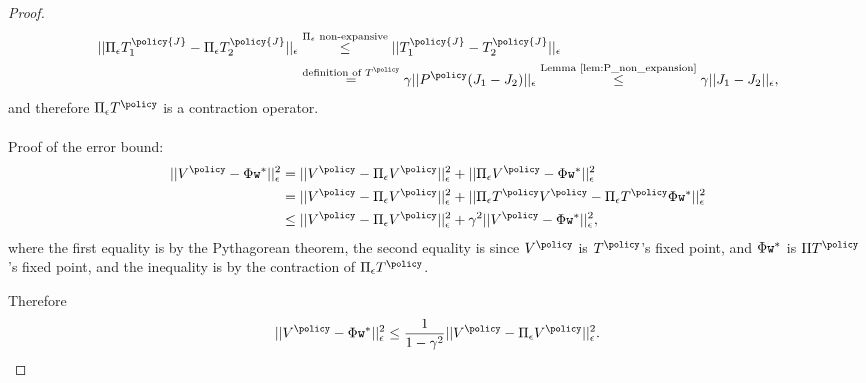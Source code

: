 \begin{proof}
\begin{equation*}
\begin{split}
||\Pi_\epsilon T^\policy {J}_1 - \Pi_\epsilon T^\policy {J}_2||_\epsilon &\overset{\Pi_\epsilon \textrm{ non-expansive}}{\le} ||T^\policy {J}_1 - T^\policy {J}_2||_\epsilon\\
&\overset{\textrm{definition of } T^\policy}{=} \gamma||P^\policy({J}_1-{J}_2)||_\epsilon \overset{\textrm{Lemma \ref{lem:P_non_expansion}}}{\le} \gamma||{J}_1-{J}_2||_\epsilon ,
\end{split}
\end{equation*}
and therefore $\Pi_\epsilon T^\policy$ is a contraction operator.
\\
\\
Proof of the error bound:
\begin{equation}
\begin{split}
  ||V^\policy - \FtrMtx \weights^*||_\epsilon^2  &= ||V^\policy
-\Pi_\epsilon V^\policy||_\epsilon^2 + ||\Pi_\epsilon V^\policy -\FtrMtx \weights^*||_\epsilon^2  \\
    &= ||V^\policy -\Pi_\epsilon V^\policy||_\epsilon^2 + ||\Pi_\epsilon T^\policy V^\policy -\Pi_\epsilon T^\policy\FtrMtx \weights^*||_\epsilon^2 \\
&\leq ||V^\policy -\Pi_\epsilon V^\policy||_\epsilon^2 + \gamma^2||V^\policy-\FtrMtx \weights^*||_\epsilon^2,
\end{split}
\end{equation}
where the first equality is by the Pythagorean theorem, the second equality is since $V^\policy$ is $T^\policy$'s fixed point, and $\Phi \texttt{w}^*$ is $\Pi T^\policy$'s fixed point, and the inequality is by the contraction of $\Pi_\epsilon T^\policy$.

Therefore
$$||V^\policy - \FtrMtx \weights^*||_\epsilon^2 \le \frac{1}{1-\gamma^2}||V^\policy-\Pi_\epsilon V^\policy||_\epsilon^2.$$
\end{proof}

